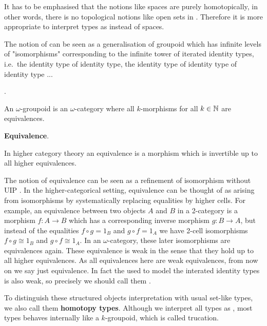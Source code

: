\begin{remark}
It has to be emphasised that the notions like spaces are purely homotopically, in other words, there is no topological notions like open sets in \hott. Therefore it is more appropriate to interpret types as \og instead of spaces. 

The notion of \og can be seen as a generalisation of groupoid which has infinite levels of "isomorphisms" corresponding to the infinite tower of iterated identity types, i.e.\ the identity type of identity type, the identity type of identity type of identity type ... 


\begin{definition}
\textbf{\ogs}.

An $\omega$-groupoid is an $\omega$-category where all $k$-morphisms for all $k \in \mathbb{N}$ are equivalences. 
\end{definition}

\begin{definition}
\textbf{Equivalence}.

In higher category theory an equivalence is a morphism which is invertible up to all higher equivalences.
\end{definition}


The notion of equivalence can be seen as a refinement of isomorphism without UIP \cite{txa:csl}. 
In the higher-categorical setting, equivalence can be thought of as arising from isomorphisms by systematically replacing equalities by higher cells.
For example, an equivalence 
between two objects $A$ and $B$ in a 2-category is a morphism $f : A \rightarrow B$ which has a
corresponding inverse morphism $ g : B \rightarrow A$, but instead of the
equalities $f ∘ g = 1_B$ and $g ∘ f = 1_A$ we have 2-cell isomorphisms $f ∘ g ≅ 1_B$ and $g ∘ f ≅ 1_A$. In an $\omega$-category, these later isomorphisms are equivalences again.
These equivalence is weak in the sense that they hold up to all higher equivalences. 
As all equivalences here are weak equivalences, from now on we say just equivalence.
In fact the \og used to model the interated identity types is also weak, so precisely we should call them \wog.

\end{remark}



To distinguish these structured objects interpretation with usual set-like types, we also call them \textbf{homotopy types}. Although we interpret all types as \og, most types behaves internally like a $k$-groupoid, which is called trucation.

